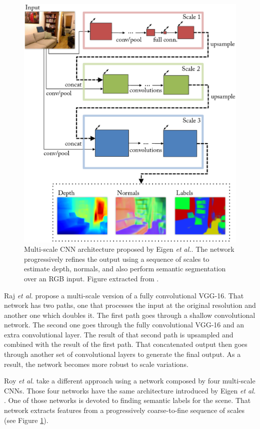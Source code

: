 \begin{figure}[!htb]
	\centering
	\includegraphics[width=0.86\linewidth]{Figures/Segmentation/eigenmultiscale.eps}
	\caption{Multi-scale \acs{CNN} architecture proposed by Eigen \emph{et al.}\cite{Eigen2015}. The network progressively refines the output using a sequence of scales to estimate depth, normals, and also perform semantic segmentation over an \acs{RGB} input. Figure extracted from \cite{Eigen2015}.}
	\label{fig:semseg:eigen-multiscale}
\end{figure}

Raj \emph{et al.}\cite{Raj2015} propose a multi-scale version of a fully convolutional \acs{VGG}-16. That network has two paths, one that processes the input at the original resolution and another one which doubles it. The first path goes through a shallow convolutional network. The second one goes through the fully convolutional \acs{VGG}-16 and an extra convolutional layer. The result of that second path is upsampled and combined with the result of the first path. That concatenated output then goes through another set of convolutional layers to generate the final output. As a result, the network becomes more robust to scale variations.

Roy \emph{et al.}\cite{Roy2016} take a different approach using a network composed by four multi-scale \acp{CNN}. Those four networks have the same architecture introduced by Eigen \emph{et al.} \cite{Eigen2015}. One of those networks is devoted to finding semantic labels for the scene. That network extracts features from a progressively coarse-to-fine sequence of scales (see Figure \ref{fig:semseg:eigen-multiscale}).


